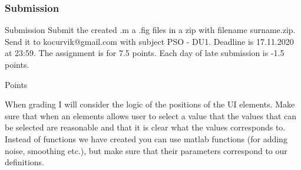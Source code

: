 \documentclass{beamer}
\begin{document}
\begin{frame}
\frametitle{Submission}
\begin{block}{Submission}
Submit the created .m a .fig files in a zip with filename surname.zip. Send it to kocurvik@gmail.com with subject PSO - DU1. Deadline is 17.11.2020 at 23:59. The assignment is for 7.5 points. Each day of late submission is -1.5 points.
\end{block}

\begin{block}{Points}

When grading I will consider the logic of the positions of the UI elements. Make sure that when an elements allows user to select a value that the values that can be selected are reasonable and that it is clear what the values corresponds to. Instead of functions we have created you can use matlab functions (for adding noise, smoothing etc.), but make sure that their parameters correspond to our definitions.
\end{block}
\end{frame}
\end{document}
